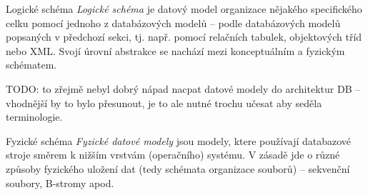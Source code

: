 \begin{obecne}{Logické schéma}
\emph{Logické schéma} je datový model organizace nějakého specifického celku pomocí jednoho z databázových modelů -- podle databázových modelů popsaných v předchozí sekci, tj. např. pomocí relačních tabulek, objektových tříd nebo XML. Svojí úrovní abstrakce se nachází mezi konceptuálním a fyzickým schématem.

TODO: to zřejmě nebyl dobrý nápad nacpat datové modely do architektur DB -- vhodnější by to bylo přesunout, je to ale nutné trochu učesat aby seděla terminologie.
\end{obecne}

\begin{obecne}{Fyzické schéma}
\emph{Fyzické datové modely} jsou modely, ktere používají databazové stroje směrem k nižším vrstvám (operačního) systému. V zásadě jde o různé způsoby fyzického uložení dat (tedy schémata organizace souborů) -- sekvenční soubory, B-stromy apod.
\end{obecne}

